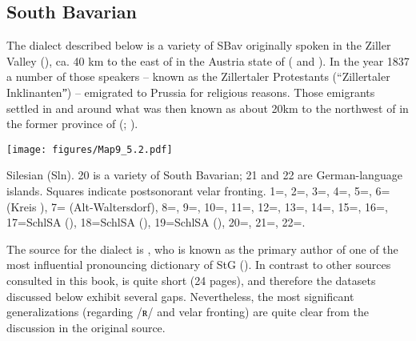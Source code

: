 \subsection{South Bavarian}\label{sec:5.3.2}

The dialect described below is a variety of SBav originally spoken in the Ziller Valley (), ca. 40 km to the east of  in the Austria state of  ( and ). In the year 1837 a number of those speakers -- known as the Zillertaler Protestants (“Zillertaler Inklinantenˮ) -- emigrated to Prussia for religious reasons. Those emigrants settled in and around what was then known as  about 20km to the northwest of  in the former province of  (\citealt{Siebs1906}; ).

\begin{map}
\texttt{[image: figures/Map9\_5.2.pdf]}
 \caption[Silesian]{Silesian (Sln). 20 is a variety of South Bavarian; 21 and 22 are German-language islands. Squares indicate postsonorant velar fronting. 1=\citet{Michel1891}, 2=\citet{Meiche1898}, 3=\citet{Pautsch1901}, 4=\citet{Hoffmann1906}, 5=\citet{vonUnwert1908}, 6=\citet{Graebisch1912a} (Kreis ), 7=\citet{Graebisch1912b} (Alt-Waltersdorf), 8=\citet{Wenzel1919}, 9=\citet{Giernoth1917}, 10=\citet{Kämpf1920}, 11=\citet{Festa1925}, 12=\citet{Rieger1935}, 13=\citet{Weiser1937}, 14=\citet{Halbsguth1938}, 15=\citet{Blaschke1966}, 16=\citet{Messow1965}, 17=SchlSA (), 18=SchlSA (), 19=SchlSA (), 20=\citet{Siebs1906}, 21=\citet{Janiczek1911}, 22=\citet{Benesch1969}.\label{fig:Map9}}\label{map:9}
\end{map}

The source for the  dialect is \citet{Siebs1906}, who is known as the primary author of one of the most influential pronouncing dictionary of StG (\citealt{Siebs1898, Siebs1969}). In contrast to other sources consulted in this book, \citet{Siebs1906} is quite short (24 pages), and therefore the datasets discussed below exhibit several gaps. Nevertheless, the most significant generalizations (regarding /ʀ/ and velar fronting) are quite clear from the discussion in the original source.

